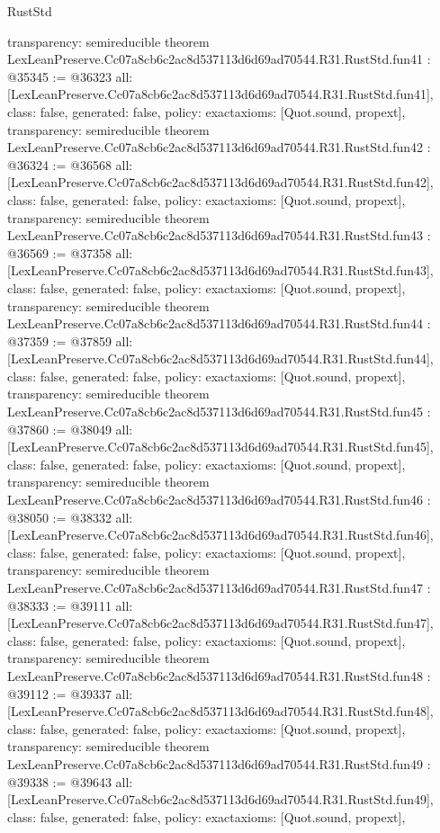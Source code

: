 \begin{lexlean}{RustStd}
\begin{coremodule}
{  transparency: semireducible
}
theorem LexLeanPreserve.Cc07a8cb6c2ac8d537113d6d69ad70544.R31.RustStd.fun41 : @35345 := @36323 {
  all: [LexLeanPreserve.Cc07a8cb6c2ac8d537113d6d69ad70544.R31.RustStd.fun41],
  class: false,
  generated: false,
  policy: exact{axioms: [Quot.sound, propext]},
  transparency: semireducible
}
theorem LexLeanPreserve.Cc07a8cb6c2ac8d537113d6d69ad70544.R31.RustStd.fun42 : @36324 := @36568 {
  all: [LexLeanPreserve.Cc07a8cb6c2ac8d537113d6d69ad70544.R31.RustStd.fun42],
  class: false,
  generated: false,
  policy: exact{axioms: [Quot.sound, propext]},
  transparency: semireducible
}
theorem LexLeanPreserve.Cc07a8cb6c2ac8d537113d6d69ad70544.R31.RustStd.fun43 : @36569 := @37358 {
  all: [LexLeanPreserve.Cc07a8cb6c2ac8d537113d6d69ad70544.R31.RustStd.fun43],
  class: false,
  generated: false,
  policy: exact{axioms: [Quot.sound, propext]},
  transparency: semireducible
}
theorem LexLeanPreserve.Cc07a8cb6c2ac8d537113d6d69ad70544.R31.RustStd.fun44 : @37359 := @37859 {
  all: [LexLeanPreserve.Cc07a8cb6c2ac8d537113d6d69ad70544.R31.RustStd.fun44],
  class: false,
  generated: false,
  policy: exact{axioms: [Quot.sound, propext]},
  transparency: semireducible
}
theorem LexLeanPreserve.Cc07a8cb6c2ac8d537113d6d69ad70544.R31.RustStd.fun45 : @37860 := @38049 {
  all: [LexLeanPreserve.Cc07a8cb6c2ac8d537113d6d69ad70544.R31.RustStd.fun45],
  class: false,
  generated: false,
  policy: exact{axioms: [Quot.sound, propext]},
  transparency: semireducible
}
theorem LexLeanPreserve.Cc07a8cb6c2ac8d537113d6d69ad70544.R31.RustStd.fun46 : @38050 := @38332 {
  all: [LexLeanPreserve.Cc07a8cb6c2ac8d537113d6d69ad70544.R31.RustStd.fun46],
  class: false,
  generated: false,
  policy: exact{axioms: [Quot.sound, propext]},
  transparency: semireducible
}
theorem LexLeanPreserve.Cc07a8cb6c2ac8d537113d6d69ad70544.R31.RustStd.fun47 : @38333 := @39111 {
  all: [LexLeanPreserve.Cc07a8cb6c2ac8d537113d6d69ad70544.R31.RustStd.fun47],
  class: false,
  generated: false,
  policy: exact{axioms: [Quot.sound, propext]},
  transparency: semireducible
}
theorem LexLeanPreserve.Cc07a8cb6c2ac8d537113d6d69ad70544.R31.RustStd.fun48 : @39112 := @39337 {
  all: [LexLeanPreserve.Cc07a8cb6c2ac8d537113d6d69ad70544.R31.RustStd.fun48],
  class: false,
  generated: false,
  policy: exact{axioms: [Quot.sound, propext]},
  transparency: semireducible
}
theorem LexLeanPreserve.Cc07a8cb6c2ac8d537113d6d69ad70544.R31.RustStd.fun49 : @39338 := @39643 {
  all: [LexLeanPreserve.Cc07a8cb6c2ac8d537113d6d69ad70544.R31.RustStd.fun49],
  class: false,
  generated: false,
  policy: exact{axioms: [Quot.sound, propext]},
}
\end{coremodule}
\end{lexlean}
